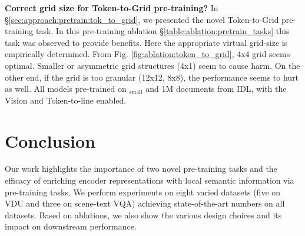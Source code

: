 \documentclass[10pt,twocolumn,letterpaper]{article}
\begin{document}
\begin{table}[htbp]
\centering
{}
\caption{\textbf{Image Encoder Ablation}: All models pre-trained on 1M docs from IDL. Swinv2 too was pre-trained and fine-tuned.}
\label{table:ablation:image_encoder}
\vspace{-0.3cm}
\end{table}


\noindent\textbf{Correct grid size for Token-to-Grid pre-training?} In \S \ref{sec:approach:pretrain:tok_to_grid}, we presented the novel Token-to-Grid pre-training task. In this pre-training ablation \S \ref{table:ablation:pretrain_tasks} this task was observed to provide benefits. Here the appropriate virtual grid-size is empirically determined. From Fig. \ref{fig:ablation:token_to_grid}, 4x4 grid seems optimal. Smaller or asymmetric grid structures (4x1) seem to cause harm. On the other end, if the grid is too granular (12x12, 8x8), the performance seems to hurt as well. All models pre-trained on \papertitleshort$_{\text{small}}$ and 1M documents from IDL, with the Vision and Token-to-line enabled. 


\section{Conclusion}

Our work \papertitle highlights the importance of two novel pre-training tasks and the efficacy of enriching encoder representations with local semantic information via pre-training tasks. We perform experiments on eight varied datasets (five on VDU and three on scene-text VQA) achieving state-of-the-art numbers on all datasets. Based on ablations, we also show the various 
design choices and its impact on downstream performance. 



























{\small


}
\end{document}
